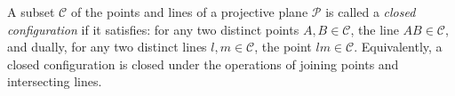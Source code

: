 A subset $\mathcal{C}$ of the points and lines of a projective plane $\mathcal{P}$ is called a \textit{closed configuration} if it satisfies: for any two distinct points $A, B \in \mathcal{C}$, the line $AB \in \mathcal{C}$, and dually, for any two distinct lines $l, m \in \mathcal{C}$, the point $lm \in \mathcal{C}$. Equivalently, a closed configuration is closed under the operations of joining points and intersecting lines.
